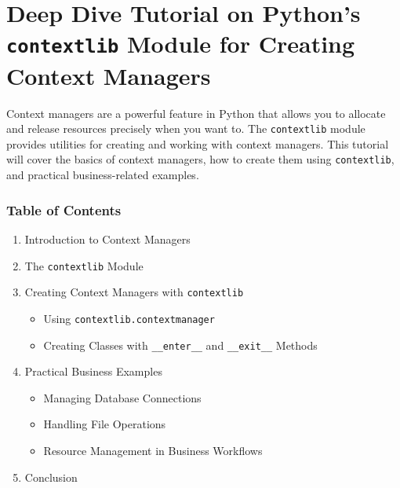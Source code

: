 \documentclass[
  letterpaper,
  DIV=11,
  numbers=noendperiod]{scrreprt}
\providecommand{\tightlist}{%
  \setlength{\itemsep}{0pt}\setlength{\parskip}{0pt}}\usepackage{longtable,booktabs,array}
\begin{document}

\chapter{\texorpdfstring{Deep Dive Tutorial on Python's
\texttt{contextlib} Module for Creating Context
Managers}{Deep Dive Tutorial on Python's contextlib Module for Creating Context Managers}}\label{deep-dive-tutorial-on-pythons-contextlib-module-for-creating-context-managers}

Context managers are a powerful feature in Python that allows you to
allocate and release resources precisely when you want to. The
\texttt{contextlib} module provides utilities for creating and working
with context managers. This tutorial will cover the basics of context
managers, how to create them using \texttt{contextlib}, and practical
business-related examples.

\subsection{Table of Contents}\label{table-of-contents-15}

\begin{enumerate}
\def\labelenumi{\arabic{enumi}.}
\tightlist
\item
  Introduction to Context Managers
\item
  The \texttt{contextlib} Module
\item
  Creating Context Managers with \texttt{contextlib}

  \begin{itemize}
  \tightlist
  \item
    Using \texttt{contextlib.contextmanager}
  \item
    Creating Classes with \texttt{\_\_enter\_\_} and
    \texttt{\_\_exit\_\_} Methods
  \end{itemize}
\item
  Practical Business Examples

  \begin{itemize}
  \tightlist
  \item
    Managing Database Connections
  \item
    Handling File Operations
  \item
    Resource Management in Business Workflows
  \end{itemize}
\item
  Conclusion
\end{enumerate}
\end{document}
